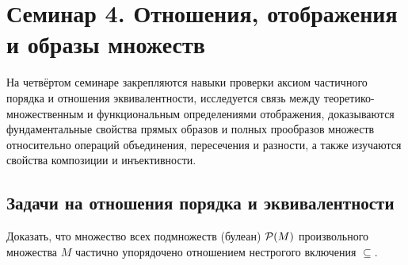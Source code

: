 \section{Семинар 4. Отношения, отображения и образы множеств}

\begin{remark}
    На четвёртом семинаре закрепляются навыки проверки аксиом частичного 
    порядка и отношения эквивалентности, исследуется связь между 
    теоретико-множественным и функциональным определениями отображения, 
    доказываются фундаментальные свойства прямых образов и полных 
    прообразов множеств относительно операций объединения, пересечения и 
    разности, а также изучаются свойства композиции и инъективности.
\end{remark}

\subsection{Задачи на отношения порядка и эквивалентности}

\begin{problem}
    Доказать, что множество всех подмножеств (булеан) $\mathcal{P}(M)$ 
    произвольного множества $M$ частично упорядочено отношением нестрогого 
    включения $\subseteq$.
\end{problem}

